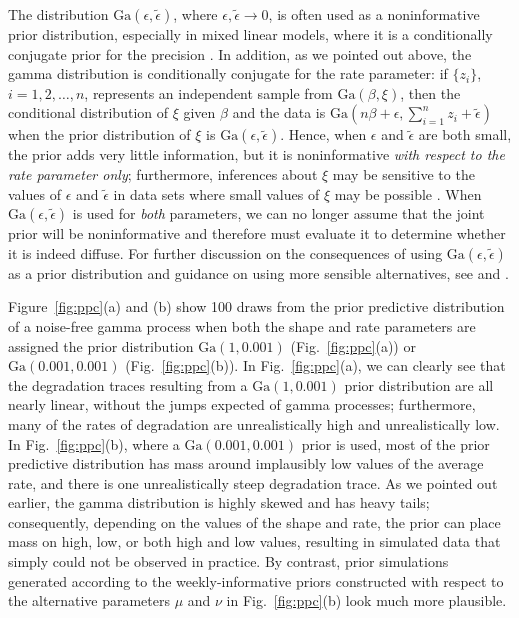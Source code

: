 The distribution $\mbox{Ga}(\epsilon, \tilde{\epsilon})$, where $\epsilon, \tilde{\epsilon}\longrightarrow 0$, is often used as a noninformative prior distribution, especially in mixed linear models, where it is a conditionally conjugate prior for the precision \citep[p.~33]{hodges_2014}. In addition, as we pointed out above, the gamma distribution is conditionally conjugate for the rate parameter: if $\{ z_i \}$, $i = 1, 2, \ldots, n$, represents an independent sample from $\mbox{Ga}(\beta, \xi)$, then the conditional distribution of $\xi$ given $\beta$ and the data is $\mbox{Ga}(n\beta + \epsilon, \sum_{i=1}^n z_i + \tilde{\epsilon})$ when the prior distribution of $\xi$ is $\mbox{Ga}(\epsilon, \tilde{\epsilon})$. Hence, when $\epsilon$ and $\tilde{\epsilon}$ are both small, the prior adds very little information, but it is noninformative \textit{with respect to the rate parameter only}; furthermore, inferences about $\xi$ may be sensitive to the values of $\epsilon$ and $\tilde{\epsilon}$ in data sets where small values of $\xi$ may be possible \citep[p.~130]{gelman_bayesian_2020}. When $\mbox{Ga}(\epsilon, \tilde{\epsilon})$ is used for \textit{both} parameters, we can no longer assume that the joint prior will be noninformative and therefore must evaluate it to determine whether it is indeed diffuse. For further discussion on the consequences of using $\mbox{Ga}(\epsilon, \tilde{\epsilon})$ as a prior distribution and guidance on using more sensible alternatives, see \cite{hodges_2014} and \cite{gelman_bayesian_2020}.

Figure~\ref{fig:ppc}(a) and (b) show 100 draws from the prior predictive distribution of a noise-free gamma process when both the shape and rate parameters are assigned the prior distribution $\mbox{Ga}(1, 0.001)$ (Fig.~\ref{fig:ppc}(a)) or $\mbox{Ga}(0.001, 0.001)$ (Fig.~\ref{fig:ppc}(b)). In Fig.~\ref{fig:ppc}(a), we can clearly see that the degradation traces resulting from a $\mbox{Ga}(1, 0.001)$ prior distribution are all nearly linear, without the jumps expected of gamma processes; furthermore, many of the rates of degradation are unrealistically high and unrealistically low. In Fig.~\ref{fig:ppc}(b), where a $\mbox{Ga}(0.001, 0.001)$ prior is used, most of the prior predictive distribution has mass around implausibly low values of the average rate, and there is one unrealistically steep degradation trace. As we pointed out earlier, the gamma distribution is highly skewed and has heavy tails; consequently, depending on the values of the shape and rate, the prior can place mass on high, low, or both high and low values, resulting in simulated data that simply could not be observed in practice. By contrast, prior simulations generated according to the weekly-informative priors constructed with respect to the alternative parameters $\mu$ and $\nu$ in Fig.~\ref{fig:ppc}(b) look much more plausible.


